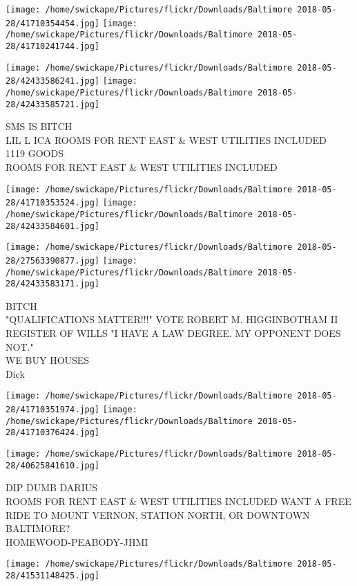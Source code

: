 \documentclass[10pt,letterpaper]{article}
\begin{document}
\texttt{[image: /home/swickape/Pictures/flickr/Downloads/Baltimore 2018-05-28/41710354454.jpg]}
\texttt{[image: /home/swickape/Pictures/flickr/Downloads/Baltimore 2018-05-28/41710241744.jpg]}

\texttt{[image: /home/swickape/Pictures/flickr/Downloads/Baltimore 2018-05-28/42433586241.jpg]}
\texttt{[image: /home/swickape/Pictures/flickr/Downloads/Baltimore 2018-05-28/42433585721.jpg]}

SMS IS BITCH\\
LIL L ICA ROOMS FOR RENT EAST \& WEST UTILITIES INCLUDED\\
1119 GOODS\\
ROOMS FOR RENT EAST \& WEST UTILITIES INCLUDED\\
\pagebreak

\texttt{[image: /home/swickape/Pictures/flickr/Downloads/Baltimore 2018-05-28/41710353524.jpg]}
\texttt{[image: /home/swickape/Pictures/flickr/Downloads/Baltimore 2018-05-28/42433584601.jpg]}

\texttt{[image: /home/swickape/Pictures/flickr/Downloads/Baltimore 2018-05-28/27563390877.jpg]}
\texttt{[image: /home/swickape/Pictures/flickr/Downloads/Baltimore 2018-05-28/42433583171.jpg]}

BITCH\\
"QUALIFICATIONS MATTER!!!" VOTE ROBERT M. HIGGINBOTHAM II REGISTER OF WILLS "I HAVE A LAW DEGREE.  MY OPPONENT DOES NOT."\\
WE BUY HOUSES\\
Dick\\
\pagebreak

\texttt{[image: /home/swickape/Pictures/flickr/Downloads/Baltimore 2018-05-28/41710351974.jpg]}
\texttt{[image: /home/swickape/Pictures/flickr/Downloads/Baltimore 2018-05-28/41710376424.jpg]}

\texttt{[image: /home/swickape/Pictures/flickr/Downloads/Baltimore 2018-05-28/40625841610.jpg]}

DIP DUMB DARIUS\\
ROOMS FOR RENT EAST \& WEST UTILITIES INCLUDED WANT A FREE RIDE TO MOUNT VERNON, STATION NORTH, OR DOWNTOWN BALTIMORE?\\
HOMEWOOD{-}PEABODY{-}JHMI\\
\pagebreak

\texttt{[image: /home/swickape/Pictures/flickr/Downloads/Baltimore 2018-05-28/41531148425.jpg]}
\end{document}

